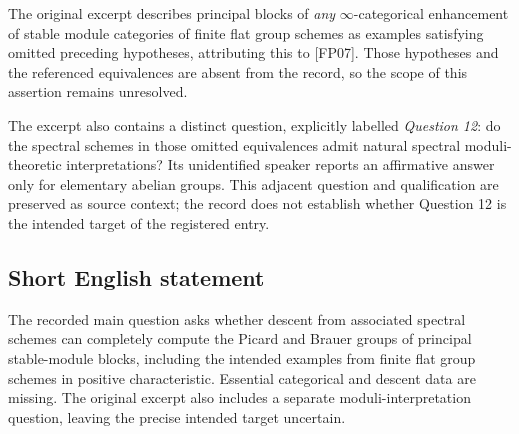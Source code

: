 \documentclass[11pt]{article}
\begin{document}
The original excerpt describes principal blocks of \emph{any} \(\infty\)-categorical enhancement of stable module categories of finite flat group schemes as examples satisfying omitted preceding hypotheses, attributing this to [FP07]. Those hypotheses and the referenced equivalences are absent from the record, so the scope of this assertion remains unresolved.

The excerpt also contains a distinct question, explicitly labelled \emph{Question 12}: do the spectral schemes in those omitted equivalences admit natural spectral moduli-theoretic interpretations? Its unidentified speaker reports an affirmative answer only for elementary abelian groups. This adjacent question and qualification are preserved as source context; the record does not establish whether Question 12 is the intended target of the registered entry.
\subsection{Short English statement}
The recorded main question asks whether descent from associated spectral schemes can completely compute the Picard and Brauer groups of principal stable-module blocks, including the intended examples from finite flat group schemes in positive characteristic. Essential categorical and descent data are missing. The original excerpt also includes a separate moduli-interpretation question, leaving the precise intended target uncertain.
\end{document}
